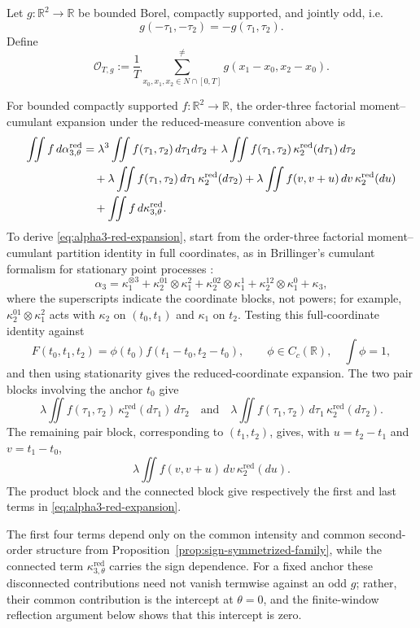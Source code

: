 \documentclass[aap,press]{apt} \volno{00} \partno{00}
\newcommand{\R}{\mathbb{R}}
\newcommand{\1}{\mathbf{1}}
\numberwithin{equation}{section}
\begin{document}
Let $g:\R^2\to\R$ be bounded Borel, compactly supported, and jointly odd, i.e.
\[
g(-\tau_1,-\tau_2)=-g(\tau_1,\tau_2).
\]
Define
\[
\mathcal O_{T,g}
:=
\frac{1}{T}
\sum_{x_0,x_1,x_2\in N\cap[0,T]}^{\neq}
g(x_1-x_0,x_2-x_0).
\]

For bounded compactly supported $f:\R^2\to\R$, the order-three factorial moment--cumulant expansion under the reduced-measure convention above is
\begin{align}
\iint f\,d\alpha_{3,\theta}^{\mathrm{red}}
&=
\lambda^3\iint f(\tau_1,\tau_2)\,d\tau_1d\tau_2 
+\lambda\iint f(\tau_1,\tau_2)\,\kappa_2^{\mathrm{red}}(d\tau_1)\,d\tau_2 \notag\\
&\quad+\lambda\iint f(\tau_1,\tau_2)\,d\tau_1\,\kappa_2^{\mathrm{red}}(d\tau_2)
+\lambda\iint f(v,v+u)\,dv\,\kappa_2^{\mathrm{red}}(du) \notag\\
&\quad+\iint f\,d\kappa_{3,\theta}^{\mathrm{red}}.
\label{eq:alpha3-red-expansion}
\end{align}
To derive \eqref{eq:alpha3-red-expansion}, start from the order-three factorial moment--cumulant partition identity in full coordinates, as in Brillinger's cumulant formalism for stationary point processes \cite{Brillinger1975}:
\[
\alpha_3
=
\kappa_1^{\otimes3}
+\kappa_2^{01}\otimes\kappa_1^2
+\kappa_2^{02}\otimes\kappa_1^1
+\kappa_2^{12}\otimes\kappa_1^0
+\kappa_3,
\]
where the superscripts indicate the coordinate blocks, not powers; for example, $\kappa_2^{01}\otimes\kappa_1^2$ acts with $\kappa_2$ on $(t_0,t_1)$ and $\kappa_1$ on $t_2$.
Testing this full-coordinate identity against
\[
F(t_0,t_1,t_2)=\phi(t_0)f(t_1-t_0,t_2-t_0),
\qquad \phi\in C_c(\R),\quad \int \phi=1,
\]
and then using stationarity gives the reduced-coordinate expansion.
The two pair blocks involving the anchor \(t_0\) give
\[
\lambda\iint f(\tau_1,\tau_2)\,
\kappa_2^{\mathrm{red}}(d\tau_1)\,d\tau_2
\quad\text{and}\quad
\lambda\iint f(\tau_1,\tau_2)\,
d\tau_1\,\kappa_2^{\mathrm{red}}(d\tau_2).
\]
The remaining pair block, corresponding to \((t_1,t_2)\), gives, with
\(u=t_2-t_1\) and \(v=t_1-t_0\),
\[
\lambda\iint f(v,v+u)\,dv\,\kappa_2^{\mathrm{red}}(du).
\]
The product block and the connected block give respectively the first
and last terms in \eqref{eq:alpha3-red-expansion}.

The first four terms depend only on the common intensity and common second-order structure from Proposition~\ref{prop:sign-symmetrized-family}, while the connected term $\kappa_{3,\theta}^{\mathrm{red}}$ carries the sign dependence. For a fixed anchor these disconnected contributions need not vanish termwise against an odd $g$; rather, their common contribution is the intercept at $\theta=0$, and the finite-window reflection argument below shows that this intercept is zero.
\end{document}

